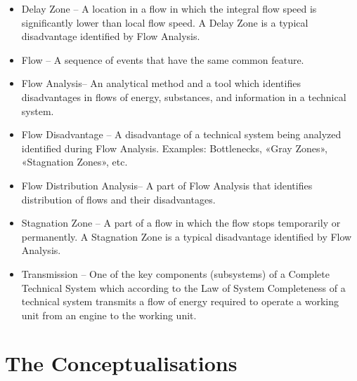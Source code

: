 \documentclass[a4paper,11pt]{article}
\begin{document}
    \begin{itemize}[noitemsep]
        \item Delay Zone -- A location in a flow in which the integral flow speed is
        significantly lower than local flow speed. A Delay Zone is a typical
        disadvantage identified by Flow Analysis. 
        \item Flow -- A sequence of events that have the same common feature.
        \item  Flow Analysis-- An analytical method and a tool which identifies
        disadvantages in flows of energy, substances, and information in a technical
        system.
        \item  Flow Disadvantage -- A disadvantage of a technical system being
        analyzed identified during Flow Analysis. Examples: Bottlenecks, «Gray
        Zones», «Stagnation Zones», etc.
        \item Flow Distribution Analysis-- A part of Flow Analysis that identifies
        distribution of flows and their disadvantages. 
        \item Stagnation Zone -- A part of a flow in which the flow stops temporarily
        or permanently. A Stagnation Zone is a typical disadvantage identified by
        Flow Analysis.
        \item Transmission -- One of the key components (subsystems) of a Complete
        Technical System which according to the Law of System Completeness of a
        technical system transmits a flow of energy required to operate a working
        unit from an engine to the working unit.
    \end{itemize}

    \section{The Conceptualisations}
\end{document}

